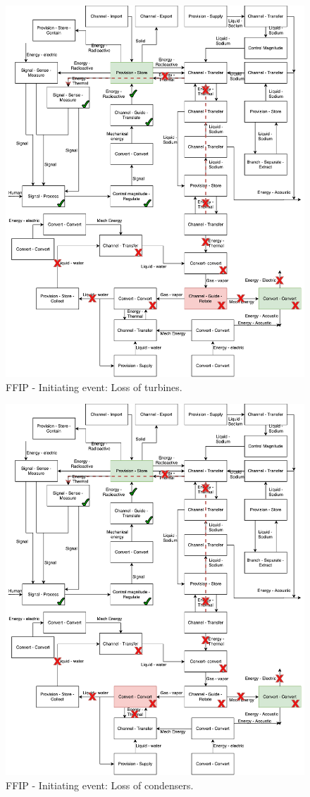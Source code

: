 \begin{figure}[t]
\centering
\includegraphics[scale=.55]{fig0d/FFIP_2}
\caption{FFIP - Initiating event: Loss of turbines.}
\label{fig:ffip2}
\end{figure}

\begin{figure}[t]
\centering
\includegraphics[scale=.55]{fig0d/FFIP_3}
\caption{FFIP - Initiating event: Loss of condensers.}
\label{fig:ffip3}
\end{figure}



\
